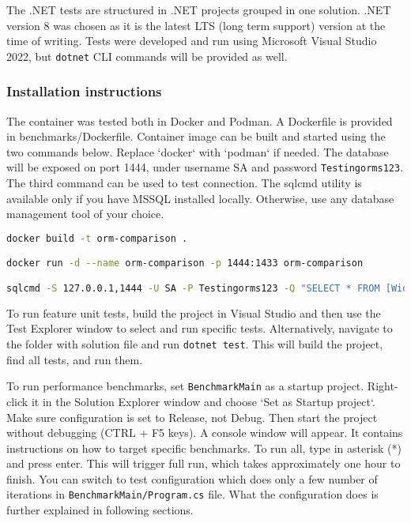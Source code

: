 The .NET tests are structured in .NET projects grouped in one solution. .NET version 8 was chosen as it is the latest LTS (long term support) version at the time of writing.\cite{netversions} Tests were developed and run using Microsoft Visual Studio 2022, but \texttt{dotnet} CLI commands will be provided as well.

\subsubsection{Installation instructions}
The container was tested both in Docker and Podman. A Dockerfile is provided in benchmarks/Dockerfile. Container image can be built and started using the two commands below. Replace `docker` with `podman` if needed. The database will be exposed on port 1444, under username SA and password \texttt{Testingorms123}.
The third command can be used to test connection. The sqlcmd utility is available only if you have MSSQL installed locally. Otherwise, use any database management tool of your choice.

\begin{lstlisting}[language=sh]
docker build -t orm-comparison .

docker run -d --name orm-comparison -p 1444:1433 orm-comparison

sqlcmd -S 127.0.0.1,1444 -U SA -P Testingorms123 -Q "SELECT * FROM [WideWorldImporters].[Purchasing].[PurchaseOrders]"
\end{lstlisting}

To run feature unit tests, build the project in Visual Studio and then use the Test Explorer window to select and run specific tests. Alternatively, navigate to the folder with solution file and run \lstinline{dotnet test}. This will build the project, find all tests, and run them. 

To run performance benchmarks, set \texttt{BenchmarkMain} as a startup project. Right-click it in the Solution Explorer window and choose `Set as Startup project`. Make sure configuration is set to Release, not Debug. Then start the project without debugging (CTRL + F5 keys). A console window will appear. It contains instructions on how to target specific benchmarks. To run all, type in asterisk (*) and press enter. This will trigger full run, which takes approximately one hour to finish. You can switch to test configuration which does only a few number of iterations in \texttt{BenchmarkMain/Program.cs} file. What the configuration does is further explained in following sections. 

